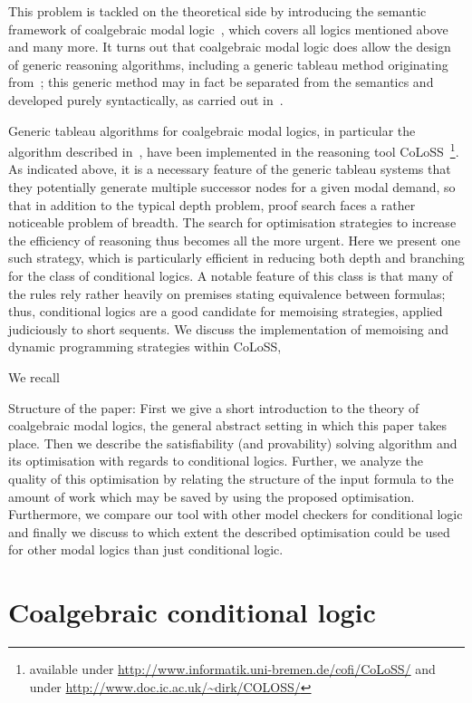 \documentclass{entcs} \usepackage{entcsmacro}
\newcommand{\COLOSS}{{\textrm CoLoSS}}
\begin{document}
This problem is tackled on the theoretical side by introducing the
semantic framework of coalgebraic modal
logic~\cite{Pattinson03,Schroder05}, which covers all logics mentioned
above and many more. It turns out that coalgebraic modal logic does
allow the design of generic reasoning algorithms, including a generic
tableau method originating from~\cite{SchroderPattinson09}; this
generic method may in fact be separated from the semantics and
developed purely syntactically, as carried out
in~\cite{PattinsonSchroder08b,PattinsonSchroder09a}. 

Generic tableau algorithms for coalgebraic modal logics, in particular
the algorithm described in~\cite{SchroderPattinson09}, have been
implemented in the reasoning tool
\COLOSS~\cite{CalinEA09}\footnote{available under
  \url{http://www.informatik.uni-bremen.de/cofi/CoLoSS/} and under
  \url{http://www.doc.ic.ac.uk/~dirk/COLOSS/}}. As indicated above, it
is a necessary feature of the generic tableau systems that they
potentially generate multiple successor nodes for a given modal
demand, so that in addition to the typical depth problem, proof search
faces a rather noticeable problem of breadth. The search for
optimisation strategies to increase the efficiency of reasoning thus
becomes all the more urgent. Here we present one such strategy, which
is particularly efficient in reducing both depth and branching for the
class of conditional logics. A notable feature of this class is that
many of the rules rely rather heavily on premises stating equivalence
between formulas; thus, conditional logics are a good candidate for
memoising strategies, applied judiciously to short sequents. We
discuss the implementation of memoising and dynamic programming
strategies within \COLOSS, 

We recall 

Structure of the paper: First we give a short introduction to
the theory of coalgebraic modal logics, the general abstract
setting in which this paper takes place. Then we describe the
satisfiability (and provability) solving algorithm and its
optimisation with regards to conditional logics. Further, we 
analyze the quality of this optimisation by relating
the structure of the input formula to the amount of work which may
be saved by using the proposed optimisation. Furthermore,
we compare our tool with other model checkers for conditional logic
and finally we discuss to which extent the described
optimisation could be used for other modal logics than just
conditional logic.
 
\section{Coalgebraic conditional logic}
\end{document}
